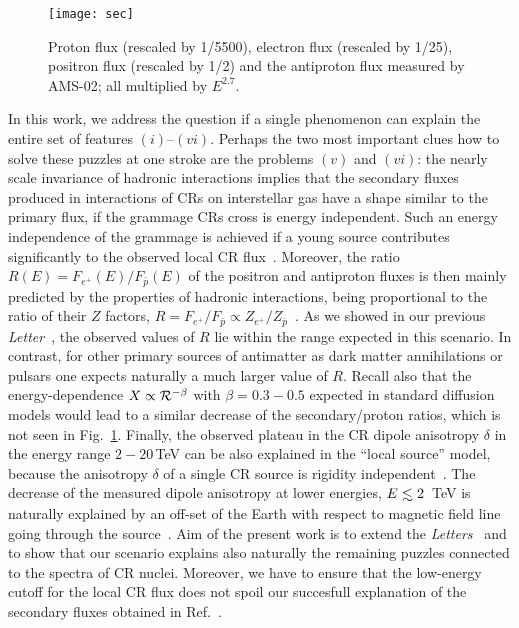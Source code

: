 \documentclass[prd,aps,twocolumn]{revtex4}
\def\lsim{\raise0.3ex\hbox{$\;<$\kern-0.75em\raise-1.1ex\hbox{$\sim\;$}}}
\def\R{{\cal R}}
\begin{document}
\begin{figure}
\texttt{[image: sec]}
\caption{Proton flux (rescaled by 1/5500), electron flux  (rescaled by 1/25),
positron flux (rescaled by 1/2)  and the antiproton flux  measured by AMS-02;
all multiplied by $E^{2.7}$.}
\label{fig:sec}
\end{figure}


In this work, we address the question if a single phenomenon can explain 
the entire set of features $(i)$--$(vi)$.
Perhaps the two most important clues how to solve these puzzles at one stroke
are the problems $(v)$ and $(vi)$: the nearly scale invariance of hadronic 
interactions implies that the secondary fluxes produced in interactions of 
CRs on interstellar gas have a shape similar to the primary flux, if the 
grammage CRs cross is energy independent. Such an energy independence of
the grammage is achieved if a young source contributes significantly 
to the observed local CR flux~\cite{PRL}. 
Moreover, the ratio $R(E)=F_{e^+}(E)/F_{\bar p}(E)$ of the positron
and antiproton fluxes is then mainly predicted by the properties of hadronic 
interactions,  being proportional to the ratio of their $Z$ factors,  
$R=F_{e^+}/F_{\bar p}\propto Z_{e^+}/Z_{\bar p}$~\cite{PRL,lipari}. 
As we showed in our previous {\em Letter\/}~\cite{PRL},  
the observed values of $R$ lie within the range
expected in this scenario. In contrast, for other primary 
sources of antimatter as dark matter annihilations or pulsars one expects 
naturally a much larger value of $R$. Recall also that the energy-dependence 
$X\propto \R^{-\beta}$ with $\beta=0.3-0.5$ expected in standard diffusion 
models would lead to a similar decrease of the secondary/proton ratios,
which is not seen in Fig.~\ref{fig:sec}. 
Finally, the observed plateau in the CR dipole anisotropy $\delta$ in
the energy range $2-20$\,TeV can be also 
explained in the ``local source'' model, because the anisotropy $\delta$ 
of a single CR source is rigidity independent~\cite{savchenko}.
The decrease of the measured dipole anisotropy at lower energies,
$E\lsim 2$\, TeV is naturally explained by an off-set of the
Earth with respect to magnetic field line going through
the source~\cite{savchenko}.
Aim of the present work is to extend the {\em Letters}~\cite{PRL,savchenko} 
and to show that our scenario explains also naturally the remaining puzzles
connected to the spectra of CR nuclei. Moreover, we have to ensure
that the low-energy cutoff for the local CR flux does
not spoil our succesfull explanation of the secondary fluxes obtained in
Ref.~\cite{PRL}.
\end{document}
